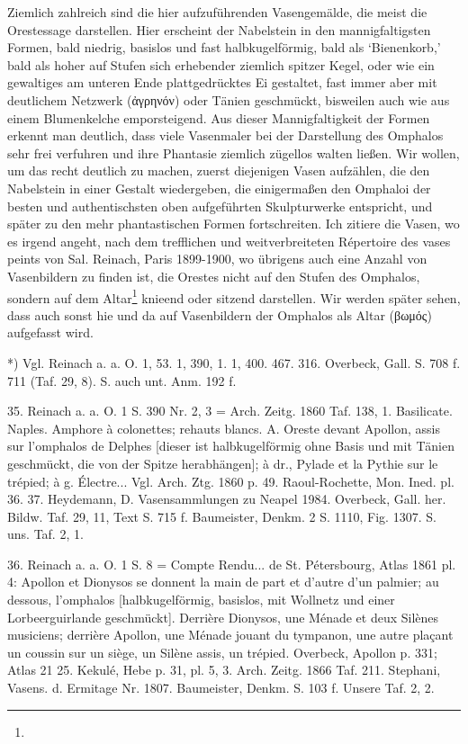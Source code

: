 \documentclass[a4paper, 11pt, oneside]{article}
\begin{document}
Ziemlich zahlreich sind die hier aufzuführenden Vasengemälde, die meist die Orestessage darstellen. Hier erscheint der Nabelstein in den mannigfaltigsten Formen, bald niedrig, basislos und fast halbkugelförmig, bald als `Bienenkorb,' bald als hoher auf Stufen sich erhebender ziemlich spitzer Kegel, oder wie ein gewaltiges am unteren Ende plattgedrücktes Ei gestaltet, fast immer aber mit deutlichem Netzwerk (ἀγρηνόν) oder Tänien geschmückt, bisweilen auch wie aus einem Blumenkelche emporsteigend. Aus dieser Mannigfaltigkeit der Formen erkennt man deutlich, dass viele Vasenmaler bei der Darstellung des Omphalos sehr frei verfuhren und ihre Phantasie ziemlich zügellos walten ließen. Wir wollen, um das recht deutlich zu machen, zuerst diejenigen Vasen aufzählen, die den Nabelstein in einer Gestalt wiedergeben, die einigermaßen den Omphaloi der besten und authentischsten oben aufgeführten Skulpturwerke entspricht, und später zu den mehr phantastischen Formen fortschreiten. Ich zitiere die Vasen, wo es irgend angeht, nach dem trefflichen und weitverbreiteten Répertoire des vases peints von Sal. Reinach, Paris 1899-1900, wo übrigens auch eine Anzahl von Vasenbildern zu finden ist, die Orestes nicht auf den Stufen des Omphalos, sondern auf dem Altar\footnote{} knieend oder sitzend darstellen. Wir werden später sehen, dass auch sonst hie und da auf Vasenbildern der Omphalos als Altar (βωμός) aufgefasst wird.

*) Vgl. Reinach a. a. O. 1, 53. 1, 390, 1. 1, 400. 467. 316. Overbeck, Gall. S. 708 f. 711 (Taf. 29, 8). S. auch unt. Anm. 192 f.

35. Reinach a. a. O. 1 S. 390 Nr. 2, 3 = Arch. Zeitg. 1860 Taf. 138, 1. Basilicate. Naples. Amphore à colonettes; rehauts blancs. A. Oreste devant Apollon, assis sur l'omphalos de Delphes [dieser ist halbkugelförmig ohne Basis und mit Tänien geschmückt, die von der Spitze herabhängen]; à dr., Pylade et la Pythie sur le trépied; à g. Électre... Vgl. Arch. Ztg. 1860 p. 49. Raoul-Rochette, Mon. Ined. pl. 36. 37. Heydemann, D. Vasensammlungen zu Neapel 1984. Overbeck, Gall. her. Bildw. Taf. 29, 11, Text S. 715 f. Baumeister, Denkm. 2 S. 1110, Fig. 1307. S. uns. Taf. 2, 1.

36. Reinach a. a. O. 1 S. 8 = Compte Rendu... de St. Pétersbourg, Atlas 1861 pl. 4: Apollon et Dionysos se donnent la main de part et d'autre d'un palmier; au dessous, l'omphalos [halbkugelförmig, basislos, mit Wollnetz und einer Lorbeerguirlande geschmückt]. Derrière Dionysos, une Ménade et deux Silènes musiciens; derrière Apollon, une Ménade jouant du tympanon, une autre plaçant un coussin sur un siège, un Silène assis, un trépied. Overbeck, Apollon p. 331; Atlas 21 25. Kekulé, Hebe p. 31, pl. 5, 3. Arch. Zeitg. 1866 Taf. 211. Stephani, Vasens. d. Ermitage Nr. 1807. Baumeister, Denkm. S. 103 f. Unsere Taf. 2, 2.
\end{document}
